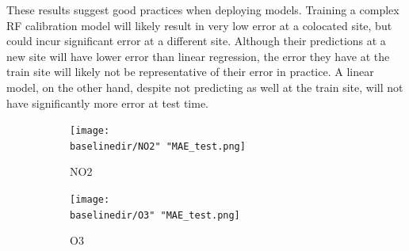 \documentclass[journal abbreviation, manuscript]{copernicus}
\begin{document}
These results suggest good practices when deploying models. Training a complex RF calibration model will likely result in very low error at a colocated site, but could incur significant error at a different site. Although their predictions at a new site will have lower error than linear regression, the error they have at the train site will likely not be representative of their error in practice. A linear model, on the other hand, despite not predicting as well at the train site, will not have significantly more error at test time.

\begin{figure}[H]
\centering
\begin{subfigure}{0.45\textwidth}
\texttt{[image: \\baselinedir/NO2" "MAE\_test.png]}
\caption{NO2}
\end{subfigure}
\begin{subfigure}{0.45\textwidth}
\texttt{[image: \\baselinedir/O3" "MAE\_test.png]}
\caption{O3}
\end{subfigure}
\caption{}
\label{fig:results-linear}
\end{figure}

\iffalse
\end{document}
